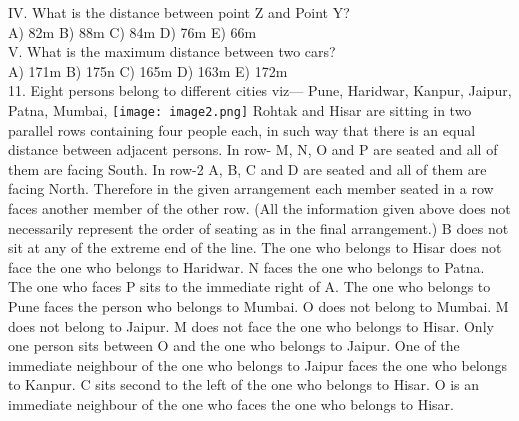 \documentclass[
]{article}
\begin{document}
IV. What is the distance between point Z and Point Y?\\
A) 82m \hspace{2mm}B) 88m \hspace{2mm}C) 84m \hspace{2mm}D) 76m \hspace{2mm}E) 66m\\

V. What is the maximum distance between two cars?\\
A) 171m \hspace{2mm}B) 175n \hspace{2mm}C) 165m \hspace{2mm}D) 163m \hspace{2mm}E) 172m\\

11. Eight persons belong to different cities viz— Pune, Haridwar, Kanpur, Jaipur, Patna,
Mumbai, \texttt{[image: image2.png]} Rohtak and Hisar are sitting in two parallel rows containing four people each, in
such way that there is an equal distance between adjacent persons. In row- M, N, O and P
are seated and all of them are facing South. In row-2 A, B, C and D are seated and all of
them are facing North. Therefore in the given arrangement each member seated in a row
faces another member of the other row. (All the information given above does not
necessarily represent the order of seating as in the final arrangement.) B does not sit at any
of the extreme end of the line. The one who belongs to Hisar does not face the one who
belongs to Haridwar. N faces the one who belongs to Patna. The one who faces P sits to the
immediate right of A. The one who belongs to Pune faces the person who belongs to
Mumbai. O does not belong to Mumbai. M does not belong to Jaipur. M does not face the
one who belongs to Hisar. Only one person sits between O and the one who belongs to
Jaipur. One of the immediate neighbour of the one who belongs to Jaipur faces the one who
belongs to Kanpur. C sits second to the left of the one who belongs to Hisar. O is an
immediate neighbour of the one who faces the one who belongs to Hisar.\\
\end{document}
